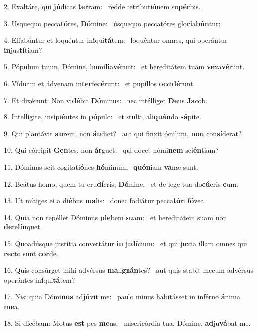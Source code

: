 2. Exaltáre, qui \textbf{jú}dicas \textbf{ter}ram: \ast\  redde retributi\textbf{ó}nem su\textbf{pér}bis.\

3. Usquequo pecca\textbf{tó}res, \textbf{Dó}mine: \ast\  úsquequo peccatóres glo\textbf{ri}a\textbf{bún}tur:\

4. Effabúntur et loquéntur in\textbf{i}qui\textbf{tá}tem: \ast\  loquéntur omnes, qui operántur \textbf{in}jus\textbf{tí}tiam?\

5. Pópulum tuum, Dómine, humi\textbf{li}a\textbf{vé}runt: \ast\  et hereditátem tuam \textbf{ve}xa\textbf{vé}runt.\

6. Víduam et ádvenam in\textbf{ter}fe\textbf{cé}runt: \ast\  et pupíllos \textbf{oc}ci\textbf{dé}runt.\

7. Et dixérunt: Non vi\textbf{dé}bit \textbf{Dó}minus: \ast\  nec intélliget \textbf{De}us \textbf{Ja}cob.\

8. Intellígite, insipi\textbf{én}tes in \textbf{pó}pulo: \ast\  et stulti, ali\textbf{quán}do \textbf{sá}pite.\

9. Qui plantávit \textbf{au}rem, non \textbf{áu}diet? \ast\  aut qui finxit óculum, \textbf{non} con\textbf{sí}derat?\

10. Qui córripit \textbf{Gen}tes, non \textbf{ár}guet: \ast\  qui docet hómi\textbf{nem} sci\textbf{én}tiam?\

11. Dóminus scit cogitati\textbf{ó}nes \textbf{hó}minum, \ast\  \textbf{quón}iam \textbf{va}næ sunt.\

12. Beátus homo, quem tu eru\textbf{dí}eris, \textbf{Dó}mine, \ast\  et de lege tua do\textbf{cú}eris \textbf{e}um.\

13. Ut mítiges ei a di\textbf{é}bus \textbf{ma}lis: \ast\  donec fodiátur pecca\textbf{tó}ri \textbf{fó}vea.\

14. Quia non repéllet Dóminus \textbf{ple}bem \textbf{su}am: \ast\  et hereditátem suam non \textbf{de}re\textbf{lín}quet.\

15. Quoadúsque justítia convertátur \textbf{in} ju\textbf{dí}cium: \ast\  et qui juxta illam omnes qui \textbf{rec}to sunt \textbf{cor}de.\

16. Quis consúrget mihi advérsus \textbf{ma}li\textbf{gnán}tes? \ast\  aut quis stabit mecum advérsus operántes in\textbf{i}qui\textbf{tá}tem?\

17. Nisi quia Dómi\textbf{nus} ad\textbf{jú}vit me: \ast\  paulo minus habitásset in inférno \textbf{á}nima \textbf{me}a.\

18. Si dicébam: Motus \textbf{est} pes \textbf{me}us: \ast\  misericórdia tua, Dómine, \textbf{ad}ju\textbf{vá}bat me.\

